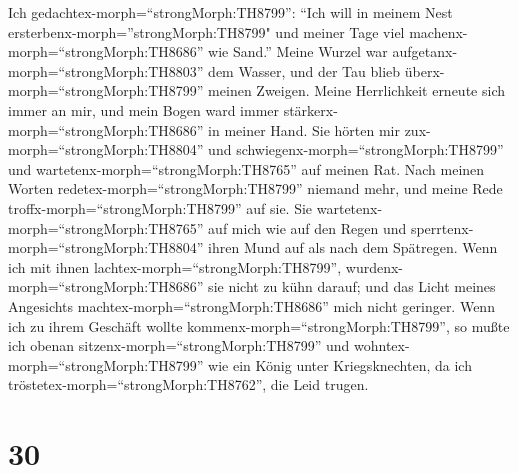  Ich gedachtex-morph=``strongMorph:TH8799'': ``Ich will in
meinem Nest ersterbenx-morph=''strongMorph:TH8799" und meiner Tage viel
machenx-morph=``strongMorph:TH8686'' wie Sand.''  Meine
Wurzel war aufgetanx-morph=``strongMorph:TH8803'' dem Wasser, und der
Tau blieb überx-morph=``strongMorph:TH8799'' meinen Zweigen.
 Meine Herrlichkeit erneute sich immer an mir, und mein
Bogen ward immer stärkerx-morph=``strongMorph:TH8686'' in meiner Hand.
 Sie hörten mir zux-morph=``strongMorph:TH8804'' und
schwiegenx-morph=``strongMorph:TH8799'' und
wartetenx-morph=``strongMorph:TH8765'' auf meinen Rat. 
Nach meinen Worten redetex-morph=``strongMorph:TH8799'' niemand mehr,
und meine Rede troffx-morph=``strongMorph:TH8799'' auf sie.
 Sie wartetenx-morph=``strongMorph:TH8765'' auf mich wie
auf den Regen und sperrtenx-morph=``strongMorph:TH8804'' ihren Mund auf
als nach dem Spätregen.  Wenn ich mit ihnen
lachtex-morph=``strongMorph:TH8799'',
wurdenx-morph=``strongMorph:TH8686'' sie nicht zu kühn darauf; und das
Licht meines Angesichts machtex-morph=``strongMorph:TH8686'' mich nicht
geringer.  Wenn ich zu ihrem Geschäft wollte
kommenx-morph=``strongMorph:TH8799'', so mußte ich obenan
sitzenx-morph=``strongMorph:TH8799'' und
wohntex-morph=``strongMorph:TH8799'' wie ein König unter Kriegsknechten,
da ich tröstetex-morph=``strongMorph:TH8762'', die Leid trugen.

\hypertarget{section-29}{%
\section{30}\label{section-29}}

